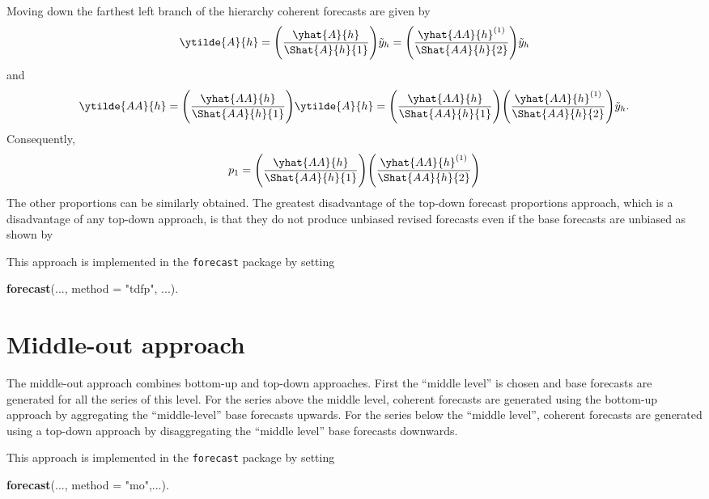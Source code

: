 \documentclass[]{book}
\newenvironment{Shaded}{\begin{snugshade}}{\end{snugshade}}
\newcommand{\DataTypeTok}[1]{\textcolor[rgb]{0.13,0.29,0.53}{#1}}
\newcommand{\KeywordTok}[1]{\textcolor[rgb]{0.13,0.29,0.53}{\textbf{#1}}}
\newcommand{\NormalTok}[1]{#1}
\newcommand{\StringTok}[1]{\textcolor[rgb]{0.31,0.60,0.02}{#1}}
\begin{document}
Moving down the farthest left branch of the hierarchy coherent forecasts are given by
\[
  \ytilde{A}{h} = \Bigg(\frac{\yhat{A}{h}}{\Shat{A}{h}{1}}\Bigg) \tilde{y}_{h} =
  \Bigg(\frac{\yhat{AA}{h}^{(1)}}{\Shat{AA}{h}{2}}\Bigg) \tilde{y}_{h}
\]
and
\[
  \ytilde{AA}{h} = \Bigg(\frac{\yhat{AA}{h}}{\Shat{AA}{h}{1}}\Bigg) \ytilde{A}{h}
  =\Bigg(\frac{\yhat{AA}{h}}{\Shat{AA}{h}{1}}\Bigg) \Bigg(\frac{\yhat{AA}{h}^{(1)}}{\Shat{AA}{h}{2}}\Bigg)\tilde{y}_{h}.
\]
Consequently,
\[
  p_1=\Bigg(\frac{\yhat{AA}{h}}{\Shat{AA}{h}{1}}\Bigg) \Bigg(\frac{\yhat{AA}{h}^{(1)}}{\Shat{AA}{h}{2}}\Bigg)
\]
The other proportions can be similarly obtained. The greatest disadvantage of the top-down forecast proportions approach, which is a disadvantage of any top-down approach, is that they do not produce unbiased revised forecasts even if the base forecasts are unbiased as shown by \citet{HynEtAl2011}

This approach is implemented in the \texttt{forecast} package by setting

\begin{Shaded}
\begin{Highlighting}[]
\KeywordTok{forecast}\NormalTok{(..., }\DataTypeTok{method =} \StringTok{"tdfp"}\NormalTok{, ...). }
\end{Highlighting}
\end{Shaded}

\hypertarget{Hier:mo}{%
\section{Middle-out approach}\label{Hier:mo}}

The middle-out approach combines bottom-up and top-down approaches. First the ``middle level'' is chosen and base forecasts are generated for all the series of this level. For the series above the middle level, coherent forecasts are generated using the bottom-up approach by aggregating the ``middle-level'' base forecasts upwards. For the series below the ``middle level'', coherent forecasts are generated using a top-down approach by disaggregating the ``middle level'' base forecasts downwards.

This approach is implemented in the \texttt{forecast} package by setting

\begin{Shaded}
\begin{Highlighting}[]
\KeywordTok{forecast}\NormalTok{(..., }\DataTypeTok{method =} \StringTok{"mo"}\NormalTok{,...). }
\end{Highlighting}
\end{Shaded}
\end{document}
